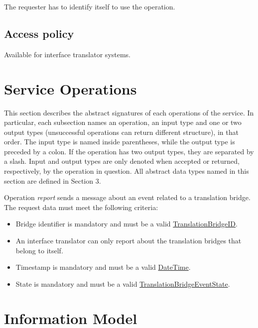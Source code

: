 \documentclass[a4paper]{arrowhead}
\newcommand{\pref}[1]{{\textcolor{ArrowheadGrey}{\hyperref[sec:model:primitives:#1]{#1}}}}
\begin{document}
The requester has to identify itself to use the operation.

\subsection{Access policy}
\label{sec:accesspolicy}

Available for interface translator systems. 

\newpage

\section{Service Operations}
\label{sec:functions}

This section describes the abstract signatures of each operations of the service. In particular, each subsection names an operation, an input type and one or two output types (unsuccessful operations can return different structure), in that order.
The input type is named inside parentheses, while the output type is preceded by a colon. If the operation has two output types, they are separated by a slash.
Input and output types are only denoted when accepted or returned, respectively, by the operation in question. All abstract data types named in this section are defined in Section 3.

{}

Operation \textit{report} sends a message about an event related to a translation bridge. The request data must meet the following criteria:

\begin{itemize}
    \item Bridge identifier is mandatory and must be a valid \pref{TranslationBridgeID}.
    \item An interface translator can only report about the translation bridges that belong to itself.
    \item Timestamp is mandatory and must be a valid \pref{DateTime}.
    \item State is mandatory and must be a valid \pref{TranslationBridgeEventState}.
\end{itemize}

\clearpage

\section{Information Model}
\label{sec:model}
\end{document}
